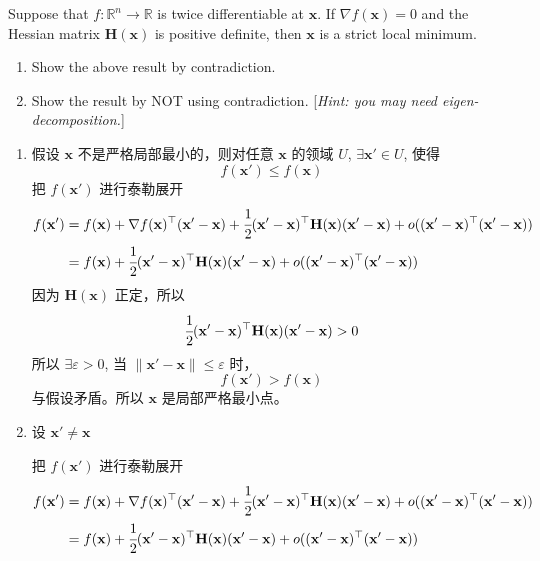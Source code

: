 \documentclass[11pt,letter,notitlepage]{article}
\begin{document}
\begin{exercise}
	Suppose that $f:\mathbb{R}^n\rightarrow\mathbb{R}$ is twice differentiable at $\mathbf{x}$. If $\nabla f(\mathbf{x})=0$ and the Hessian matrix $\mathbf{H}(\mathbf{x})$ is positive definite, then $\mathbf{x}$ is a strict local minimum.
	\begin{enumerate}
		\item Show the above result by contradiction.
		\item Show the result by NOT using contradiction. [\emph{Hint: you may need eigen-decomposition.}]
	\end{enumerate}
\end{exercise}

\begin{solution}
	\begin{enumerate}
		\item 假设 $\mathbf{x}$ 不是严格局部最小的，则对任意 $\mathbf{x}$ 的领域 $U$, $\exists \mathbf{x'} \in U$, 使得
		      $$f(\mathbf{x'}) \le f(\mathbf{x})$$
		      把 $f(\mathbf{x'})$ 进行泰勒展开
		      $$\begin{aligned}
				      f(\mathbf{x'})
				       & =f(\mathbf{x})+\nabla f(\mathbf{x})^\top (\mathbf{x'}-\mathbf{x})
				      +\cfrac{1}{2}(\mathbf{x'-\mathbf{x}})^\top \mathbf{H}(\mathbf{x}) (\mathbf{x'}-\mathbf{x})
				      +o((\mathbf{x'}-\mathbf{x})^\top (\mathbf{x'}-\mathbf{x}))           \\
				       & =f(\mathbf{x})
				      +\cfrac{1}{2}(\mathbf{x'-\mathbf{x}})^\top \mathbf{H}(\mathbf{x}) (\mathbf{x'}-\mathbf{x})
				      +o((\mathbf{x'}-\mathbf{x})^\top (\mathbf{x'}-\mathbf{x}))
			      \end{aligned}$$
		      因为 $\mathbf{H}(\mathbf{x})$ 正定，所以
		      $$\cfrac{1}{2}(\mathbf{x'}-\mathbf{x})^\top \mathbf{H}(\mathbf{x}) (\mathbf{x'}-\mathbf{x}) >0$$
		      所以 $\exists\varepsilon>0$, 当 $\|\mathbf{x'}-\mathbf{x}\|\le\varepsilon$ 时，
		      $$f(\mathbf{x'})>f(\mathbf{x})$$
		      与假设矛盾。所以 $\mathbf{x}$ 是局部严格最小点。
		\item 设 $\mathbf{x'} \neq \mathbf{x}$

		      把 $f(\mathbf{x'})$ 进行泰勒展开
		      $$\begin{aligned}
				      f(\mathbf{x'})
				       & =f(\mathbf{x})+\nabla f(\mathbf{x})^\top (\mathbf{x'}-\mathbf{x})
				      +\cfrac{1}{2}(\mathbf{x'-\mathbf{x}})^\top \mathbf{H}(\mathbf{x}) (\mathbf{x'}-\mathbf{x})
				      +o((\mathbf{x'}-\mathbf{x})^\top (\mathbf{x'}-\mathbf{x}))           \\
				       & =f(\mathbf{x})
				      +\cfrac{1}{2}(\mathbf{x'-\mathbf{x}})^\top \mathbf{H}(\mathbf{x}) (\mathbf{x'}-\mathbf{x})
				      +o((\mathbf{x'}-\mathbf{x})^\top (\mathbf{x'}-\mathbf{x}))
			      \end{aligned}$$


\end{enumerate}
\end{solution}
\end{document}
